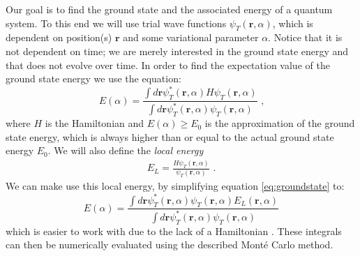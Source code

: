 Our goal is to find the ground state and the associated energy of a quantum system. To this end we will
use trial wave functions $\psi_T(\textbf{r},\alpha)$, which is dependent on position(s) $\textbf{r}$ and some variational parameter $\alpha$.
Notice that it is not dependent on time; we are merely interested in the ground state energy and that does not evolve over time.
In order to find the expectation value of the ground state energy we use the equation:
\begin{equation}
	\label{eq:groundstate}
	E(\alpha) = \frac{\int d\textbf{r} \psi_T^*(\textbf{r},\alpha)H\psi_T(\textbf{r},\alpha)}{\int d\textbf{r}
	 \psi_T^*(\textbf{r},\alpha)\psi_T(\textbf{r},\alpha)} \text{~,}
\end{equation}
where $H$ is the Hamiltonian and $E(\alpha) \geq E_0$ is the approximation of the ground state energy, which is always higher
than or equal to the actual ground state energy $E_0$.  We will also define the \textit{local energy}
\begin{align}
	\label{eq:local_energy}
	E_L = \frac{H\psi_T(\textbf{r},\alpha)}{\psi_T(\textbf{r},\alpha)} \text{~.}
\end{align}
We can make use this local energy, by simplifying equation \ref{eq:groundstate} to:
\begin{equation}
	\label{eq:groundstate2}
	E(\alpha) = \frac{\int d\textbf{r} \psi_T^*(\textbf{r},\alpha)\psi_T(\textbf{r},\alpha)E_L(\textbf{r},\alpha)}{\int d\textbf{r} \psi_T^*(\textbf{r},\alpha)\psi_T(\textbf{r},\alpha)}
\end{equation}
which is easier to work with due to the lack of a Hamiltonian \cite{JosBook}. These integrals can then be numerically evaluated using
the described Mont\'e Carlo method.



